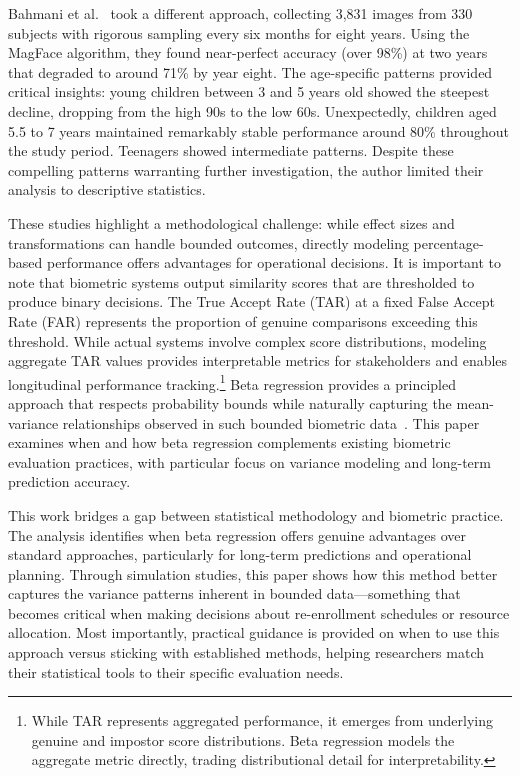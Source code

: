 \documentclass[10pt,journal,compsoc]{IEEEtran}
\begin{document}
Bahmani et al.~\cite{bahmani2023} took a different approach, collecting 3,831 images from 330 subjects with rigorous sampling every six months for eight years. Using the MagFace algorithm, they found near-perfect accuracy (over 98\%) at two years that degraded to around 71\% by year eight. The age-specific patterns provided critical insights: young children between 3 and 5 years old showed the steepest decline, dropping from the high 90s to the low 60s. Unexpectedly, children aged 5.5 to 7 years maintained remarkably stable performance around 80\% throughout the study period. Teenagers showed intermediate patterns. Despite these compelling patterns warranting further investigation, the author limited their analysis to descriptive statistics.

These studies highlight a methodological challenge: while effect sizes and transformations can handle bounded outcomes, directly modeling percentage-based performance offers advantages for operational decisions. It is important to note that biometric systems output similarity scores that are thresholded to produce binary decisions. The True Accept Rate (TAR) at a fixed False Accept Rate (FAR) represents the proportion of genuine comparisons exceeding this threshold. While actual systems involve complex score distributions, modeling aggregate TAR values provides interpretable metrics for stakeholders and enables longitudinal performance tracking.\footnote{While TAR represents aggregated performance, it emerges from underlying genuine and impostor score distributions. Beta regression models the aggregate metric directly, trading distributional detail for interpretability.} Beta regression provides a principled approach that respects probability bounds while naturally capturing the mean-variance relationships observed in such bounded biometric data~\cite{ferrari2004}. This paper examines when and how beta regression complements existing biometric evaluation practices, with particular focus on variance modeling and long-term prediction accuracy.

This work bridges a gap between statistical methodology and biometric practice. The analysis identifies when beta regression offers genuine advantages over standard approaches, particularly for long-term predictions and operational planning. Through simulation studies, this paper shows how this method better captures the variance patterns inherent in bounded data---something that becomes critical when making decisions about re-enrollment schedules or resource allocation. Most importantly, practical guidance is provided on when to use this approach versus sticking with established methods, helping researchers match their statistical tools to their specific evaluation needs.
\end{document}
